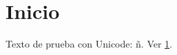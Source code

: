 \documentclass{article}
\begin{document}
\section{Inicio}\label{sec:inicio}
Texto de prueba con Unicode: ñ.
Ver \ref{sec:inicio}.
\end{document}
